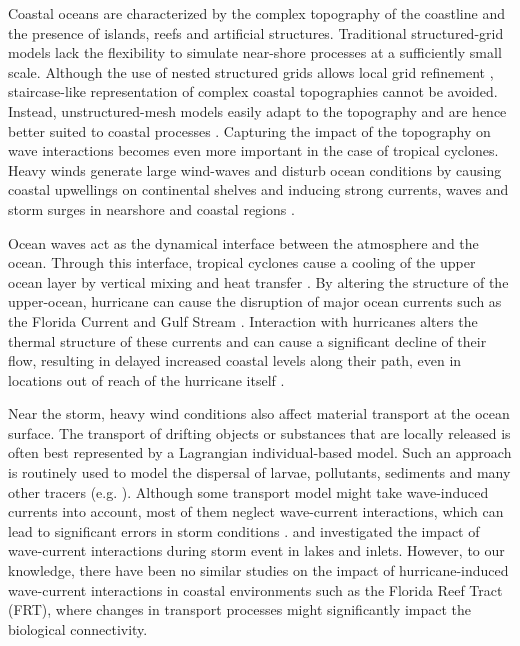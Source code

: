 Coastal oceans are characterized by the complex topography of the coastline and the presence of islands, reefs and artificial structures. Traditional structured-grid models lack the flexibility to simulate near-shore processes at a sufficiently small scale. Although the use of nested structured grids allows local grid refinement \citep{warner2010development}, staircase-like representation of complex coastal topographies cannot be avoided. Instead, unstructured-mesh models easily adapt to the topography and are hence better suited to coastal processes \citep{fringer2019future}. Capturing the impact of the topography on wave interactions becomes even more important in the case of tropical cyclones. Heavy winds generate large wind-waves and disturb ocean conditions \citep{liu2020impacts} by causing coastal upwellings on continental shelves \citep{smith1982response} and inducing strong currents, waves and storm surges in nearshore and coastal regions \citep{dietrich2010high, weisberg2006hurricane}. 

Ocean waves act as the dynamical interface between the atmosphere and the ocean. Through this interface, tropical cyclones cause a cooling of the upper ocean layer by vertical mixing and heat transfer \citep{aijaz2017nonbreaking,varlas2020investigating}. By altering the structure of the upper-ocean, hurricane can cause the disruption of major ocean currents such as the Florida Current and Gulf Stream \citep{oey2007hurricane}. Interaction with hurricanes alters the thermal structure of these currents and can cause a significant decline of their flow, resulting in delayed increased coastal levels along their path, even in locations out of reach of the hurricane itself \citep{ezer2017observations, ezer2018interaction,ezer2020long}.

Near the storm, heavy wind conditions also affect material transport at the ocean surface. The transport of drifting objects or substances that are locally released is often best represented by a Lagrangian individual-based model. Such an approach is routinely used to model the dispersal of larvae, pollutants, sediments and many other tracers (e.g. \citealp{le2012surface,liubartseva2018tracking, figueiredo2013synthesizing,frys2020fine}). Although some transport model might take wave-induced currents into account, most of them neglect wave-current interactions, which can lead to significant errors in storm conditions \citep{rohrs2012observation,curcic2016hurricane}. \cite{niu2017role} and \cite{mao2018wave,mao2020particle} investigated the impact of wave-current interactions during storm event in lakes and inlets. However, to our knowledge, there have been no similar studies on the impact of hurricane-induced wave-current interactions in coastal environments such as the Florida Reef Tract (FRT), where changes in transport processes might significantly impact the biological connectivity.

